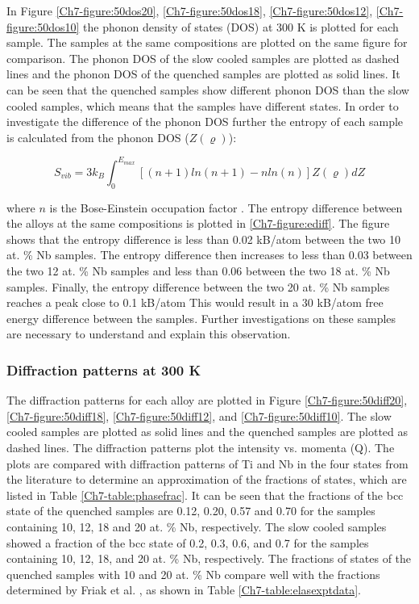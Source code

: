 In Figure \ref{Ch7-figure:50dos20}, \ref{Ch7-figure:50dos18}, \ref{Ch7-figure:50dos12}, \ref{Ch7-figure:50dos10} the phonon density of states (DOS) at 300 K is plotted for each sample. The samples at the same compositions are plotted on the same figure for comparison. The phonon DOS of the slow cooled samples are plotted as dashed lines and the phonon DOS of the quenched samples are plotted as solid lines. It can be seen that the quenched samples show different phonon DOS than the slow cooled samples, which means that the samples have different states. In order to investigate the difference of the phonon DOS further the entropy of each sample is calculated from the phonon DOS ($Z(\varrho)$):

\begin{equation}
\label{eq:phononentropy}
S_{vib} = 3 k_{B} \int_{0}^{E_{max}} \left[ \left( n+1 \right) ln\left(n+1\right) -n ln\left(n\right) \right] Z(\varrho) dZ
\end{equation}

\noindent where $n$ is the Bose-Einstein occupation factor \cite{Budai2014}. The entropy difference between the alloys at the same compositions is plotted in \ref{Ch7-figure:ediff}. The figure shows that the entropy difference is less than 0.02 kB/atom between the two 10 at. \% Nb samples. The entropy difference then increases to less than 0.03 between the two 12 at. \% Nb samples and less than 0.06 between the two 18 at. \% Nb samples. Finally, the entropy difference between the two 20 at. \% Nb samples reaches a peak close to 0.1 kB/atom This would result in a 30 kB/atom free energy difference between the samples. Further investigations on these samples are necessary to understand and explain this observation.

\subsubsection{Diffraction patterns at 300 K}

The diffraction patterns for each alloy are plotted in Figure \ref{Ch7-figure:50diff20}, \ref{Ch7-figure:50diff18}, \ref{Ch7-figure:50diff12}, and \ref{Ch7-figure:50diff10}. The slow cooled samples are plotted as solid lines and the quenched samples are plotted as dashed lines. The diffraction patterns plot the intensity vs. momenta (Q). The plots are compared with diffraction patterns of Ti and Nb in the four states from the literature to determine an approximation of the fractions of states, which are listed in Table \ref{Ch7-table:phasefrac}. It can be seen that the fractions of the bcc state of the quenched samples are 0.12, 0.20, 0.57 and 0.70 for the samples containing 10, 12, 18 and 20 at. \% Nb, respectively. The slow cooled samples showed a fraction of the bcc state of 0.2, 0.3, 0.6, and 0.7 for the samples containing 10, 12, 18, and 20 at. \% Nb, respectively. The fractions of states of the quenched samples with 10 and 20 at. \% Nb compare well with the fractions determined by Friak et al. \cite{Friak2012}, as shown in Table \ref{Ch7-table:elasexptdata}. 

